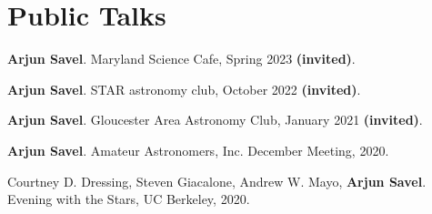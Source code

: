 \documentclass[letterpaper,10.5pt]{article}
\newcommand{\shorterSection}[1]{\vspace{-10pt}\section{#1}}
\begin{document}
\shorterSection{Public Talks}
\begin{list}{}{\cvlist}
\item[{\color{numcolor}\scriptsize5}] \textbf{Arjun Savel}. Maryland Science Cafe, Spring 2023 \textbf{(invited)}.
\item[{\color{numcolor}\scriptsize4}] \textbf{Arjun Savel}. STAR astronomy club, October 2022 \textbf{(invited)}.
\item[{\color{numcolor}\scriptsize3}] \textbf{Arjun Savel}. Gloucester Area Astronomy Club, January 2021 \textbf{(invited)}.
\item[{\color{numcolor}\scriptsize2}] \textbf{Arjun Savel}. Amateur Astronomers, Inc. December Meeting, 2020.
\item[{\color{numcolor}\scriptsize1}] Courtney D. Dressing, Steven Giacalone, Andrew W. Mayo, \textbf{Arjun Savel}. Evening with the Stars, UC Berkeley, 2020.
\end{list}
\end{document}
